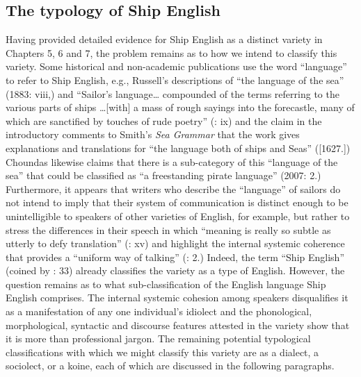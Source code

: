 \subsection{{The} {typology} {of} {Ship} {English} }%

Having provided detailed evidence for Ship English as a distinct variety in Chapters 5, 6 and 7, the problem remains as to how we intend to classify this variety. Some historical and non-academic publications use the word “language” to refer to Ship English, e.g., Russell’s descriptions of “the language of the sea” (1883: viii,) and “Sailor’s language… compounded of the terms referring to the various parts of ships …[with] a mass of rough sayings into the forecastle, many of which are sanctified by touches of rude poetry” (\citealt{Russell1883}: ix) and the claim in the introductory comments to Smith’s \textit{Sea Grammar} that the work gives explanations and translations for “the language both of ships and Seas” (\citealt{Smith1968}[1627.]) Choundas likewise claims that there is a sub-category of this “language of the sea” that could be classified as “a freestanding pirate language” (2007: 2.) Furthermore, it appears that writers who describe the “language” of sailors do not intend to imply that their system of communication is distinct enough to be unintelligible to speakers of other varieties of English, for example, but rather to stress the differences in their speech in which “meaning is really so subtle as utterly to defy translation” (\citealt{Russell1883}: xv) and highlight the internal systemic coherence that provides a “uniform way of talking” (\citealt{Choundas2007}: 2.) Indeed, the term “Ship English” (coined by \citealt{Hancock1976}: 33) already classifies the variety as a type of English. However, the question remains as to what sub-classification of the English language Ship English comprises. The internal systemic cohesion among speakers disqualifies it as a manifestation of any one individual’s idiolect and the phonological, morphological, syntactic and discourse features attested in the variety show that it is more than professional jargon. The remaining potential typological classifications with which we might classify this variety are as a dialect, a sociolect, or a koine, each of which are discussed in the following paragraphs. 

